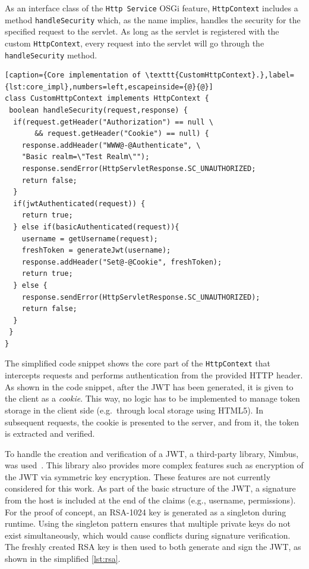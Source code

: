 \documentclass[12pt]{article}
\begin{document}
As an interface class of the \texttt{Http Service} OSGi feature, \texttt{HttpContext} includes a method \texttt{handleSecurity} which, as the name implies, handles the security for the specified request to the servlet. As long as the servlet is registered with the custom \texttt{HttpContext}, every request into the servlet will go through the \texttt{handleSecurity} method.

\begin{lstlisting}[caption={Core implementation of \texttt{CustomHttpContext}.},label={lst:core_impl},numbers=left,escapeinside={@}{@}]    
class CustomHttpContext implements HttpContext {   
 boolean handleSecurity(request,response) {
  if(request.getHeader("Authorization") == null \
       && request.getHeader("Cookie") == null) {
    response.addHeader("WWW@-@Authenticate", \
	"Basic realm=\"Test Realm\"");
    response.sendError(HttpServletResponse.SC_UNAUTHORIZED;
    return false;
  }	    
  if(jwtAuthenticated(request)) {
    return true;		
  } else if(basicAuthenticated(request)){
    username = getUsername(request);
    freshToken = generateJwt(username);
    response.addHeader("Set@-@Cookie", freshToken);
    return true;
  } else {
    response.sendError(HttpServletResponse.SC_UNAUTHORIZED);
    return false;
  }
 }
}
\end{lstlisting}

The simplified code snippet shows the core part of the \texttt{HttpContext} that intercepts requests and performs authentication from the provided HTTP header. As shown in the code snippet, after the JWT has been generated, it is given to the client as a \emph{cookie}. This way, no logic has to be implemented to manage token storage in the client side (e.g.\ through local storage using HTML5). In subsequent requests, the cookie is presented to the server, and from it, the token is extracted and verified.

To handle the creation and verification of a JWT, a third-party library, Nimbus, was used~\cite{nimbus}. This library also provides more complex features such as encryption of the JWT via symmetric key encryption. These features are not currently considered for this work. As part of the basic structure of the JWT, a signature from the host is included at the end of the claims (e.g., username, permissions). For the proof of concept, an RSA-1024 key is generated as a singleton during runtime. Using the singleton pattern ensures that multiple private keys do not exist simultaneously, which would cause conflicts during signature verification. The freshly created RSA key is then used to both generate and sign the JWT, as shown in the simplified \autoref{lst:rsa}.
\end{document}
